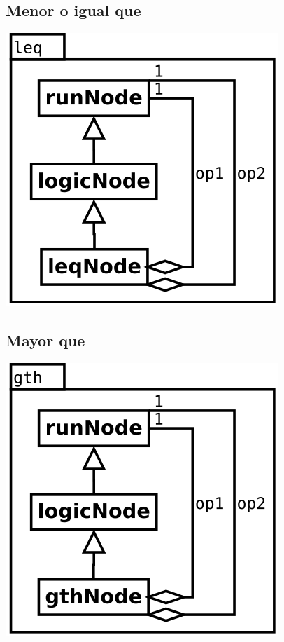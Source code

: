 \subsection {Menor o igual que}
\begin{center}
\includegraphics[scale=0.4]{leq.png} \\
\end{center}

\subsection {Mayor que}
\begin{center}
\includegraphics[scale=0.4]{gth.png} \\
\end{center}

